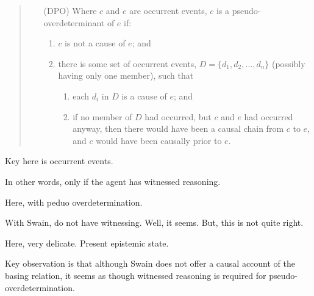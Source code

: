 \begin{note}
  \begin{quote}
    \begin{enumerate}
    \item[(DPO)]
      Where \(c\) and \(e\) are occurrent events, \(c\) is a pseudo-overdeterminant of \(e\) if:
      \begin{enumerate}[label=(\arabic*)]
      \item
        \(c\) is not a cause of \(e\); and
      \item
        there is some set of occurrent events, \(D = \{d_{1}, d_{2},\dots, d_{n}\}\) (possibly having only one member), such that
        \begin{enumerate}
        \item
          each \(d_{i}\) in \(D\) is a cause of \(e\); and
        \item
          if no member of \(D\) had occurred, but \(c\) and \(e\) had occurred anyway, then there would have been a causal chain from \(c\) to \(e\), and \(c\) would have been causally prior to \(e\).
        \end{enumerate}
      \end{enumerate}
    \end{enumerate}
  \end{quote}

  Key here is occurrent events.

  In other words, only if the agent has witnessed reasoning.
\end{note}

\begin{note}[Swain]
  Here, with peduo overdetermination.

  With Swain, do not have witnessing.
  Well, it seems.
  But, this is not quite right.

  Here, very delicate.
  Present epistemic state.

  Key observation is that although Swain does not offer a causal account of the basing relation, it seems as though witnessed reasoning is required for pseudo-overdetermination.
\end{note}

\paragraph*{\citeauthor{Tolliver:1982us}}

